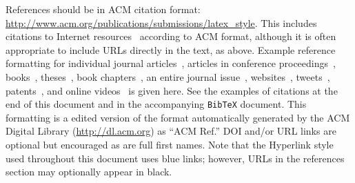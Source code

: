 \documentclass{sigchi}
\begin{document}
References should be in ACM citation format:
\url{http://www.acm.org/publications/submissions/latex_style}.  This
includes citations to Internet
resources~\cite{CHINOSAUR:venue,cavender:writing,psy:gangnam}
according to ACM format, although it is often appropriate to include
URLs directly in the text, as above. Example reference formatting for
individual journal articles~\cite{ethics}, articles in conference
proceedings~\cite{Klemmer:2002:WSC:503376.503378},
books~\cite{Schwartz:1995:GBF}, theses~\cite{sutherland:sketchpad},
book chapters~\cite{winner:politics}, an entire journal
issue~\cite{kaye:puc},
websites~\cite{acm_categories,cavender:writing},
tweets~\cite{CHINOSAUR:venue}, patents~\cite{heilig:sensorama}, and
online videos~\cite{psy:gangnam} is given here.  See the examples of
citations at the end of this document and in the accompanying
\texttt{BibTeX} document. This formatting is a edited version of the
format automatically generated by the ACM Digital Library
(\url{http://dl.acm.org}) as ``ACM Ref.'' DOI and/or URL links are
optional but encouraged as are full first names. Note that the
Hyperlink style used throughout this document uses blue links;
however, URLs in the references section may optionally appear in
black.



\end{document}
